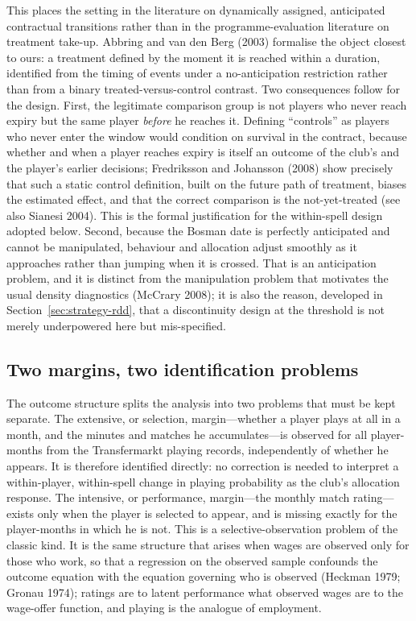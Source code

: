 \documentclass{article}
\begin{document}
This places the setting in the literature on dynamically assigned, anticipated
contractual transitions rather than in the programme-evaluation literature on
treatment take-up. Abbring and van den Berg (2003) formalise the object closest to
ours: a treatment defined by the moment it is reached within a duration, identified
from the timing of events under a no-anticipation restriction rather than from a
binary treated-versus-control contrast. Two consequences follow for the design.
First, the legitimate comparison group is not players who never reach expiry but
the same player \emph{before} he reaches it. Defining ``controls'' as players who
never enter the window would condition on survival in the contract, because
whether and when a player reaches expiry is itself an outcome of the club's and the
player's earlier decisions; Fredriksson and Johansson (2008) show precisely that
such a static control definition, built on the future path of treatment, biases the
estimated effect, and that the correct comparison is the not-yet-treated (see also
Sianesi 2004). This is the formal justification for the within-spell design adopted
below. Second, because the Bosman date is perfectly anticipated and cannot be
manipulated, behaviour and allocation adjust smoothly as it approaches rather than
jumping when it is crossed. That is an anticipation problem, and it is distinct
from the manipulation problem that motivates the usual density diagnostics
(McCrary 2008); it is also the reason, developed in
Section~\ref{sec:strategy-rdd}, that a discontinuity design at the threshold is not
merely underpowered here but mis-specified.

\subsection{Two margins, two identification problems}
\label{sec:strategy-margins}

The outcome structure splits the analysis into two problems that must be kept
separate. The extensive, or selection, margin---whether a player plays at all in a
month, and the minutes and matches he accumulates---is observed for all \NPanelObs{}
player-months from the Transfermarkt playing records, independently of whether he
appears. It is therefore identified directly: no correction is needed to interpret
a within-player, within-spell change in playing probability as the club's
allocation response. The intensive, or performance, margin---the monthly match
rating---exists only when the player is selected to appear, and is missing exactly
for the player-months in which he is not. This is a selective-observation problem
of the classic kind. It is the same structure that arises when wages are observed
only for those who work, so that a regression on the observed sample confounds the
outcome equation with the equation governing who is observed (Heckman 1979; Gronau
1974); ratings are to latent performance what observed wages are to the wage-offer
function, and playing is the analogue of employment.
\end{document}
